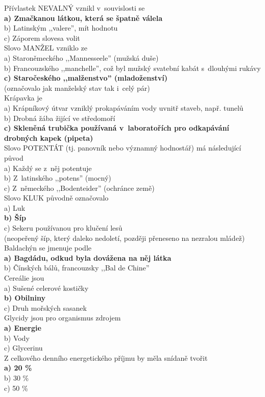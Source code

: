 \begin{multicols}{3}
\noindent
Přívlastek NEVALNÝ vznikl v~souvislosti se\\
\textbf{a) Zmačkanou látkou, která se špatně válela}\\
b) Latinským ,,valere'', mít hodnotu\\
c) Záporem slovesa volit\\

\noindent
Slovo MANŽEL vzniklo ze\\
a) Staroněmeckého ,,Mannesseele'' (mužská duše)\\
b) Francouzského ,,manchelle'', což byl mužský svatební kabát 
s~dlouhými rukávy\\
\textbf{c) Staročeského ,,malženstvo'' (mladoženství)}\\
(označovalo jak manželský stav tak i~celý pár)\\

\noindent
Krápavka je \\
a) Krápníkový útvar vzniklý prokapáváním vody uvnitř staveb, 
např. tunelů\\
b) Drobná žába žijící ve středomoří\\
\textbf{c) Skleněná trubička používaná v~laboratořích pro 
odkapávání drobných kapek (pipeta)}\\

\noindent
Slovo POTENTÁT (tj. panovník nebo významný hodnostář) má následující 
původ\\
a) Každý se z~něj potentuje\\
b) Z~latinského ,,potens'' (mocný)\\
c) Z~německého ,,Bodenteider'' (ochránce země)\\

\noindent
Slovo KLUK původně označovalo\\
a) Luk\\
\textbf{b) Šíp}\\
c) Sekeru používanou pro klučení lesů\\
(neopeřený šíp, který daleko nedoletí, později přeneseno na nezralou 
mládež)\\

\noindent
Baldachýn se jmenuje podle\\
\textbf{a) Bagdádu, odkud byla dovážena na něj látka}\\
b) Čínských bálů, francouzsky ,,Bal de Chine''\\

\noindent
Cereálie jsou\\
a) Sušené celerové kostičky\\
\textbf{b) Obilniny}\\
c) Druh mořských sasanek\\

\noindent
Glycidy jsou pro organismus zdrojem\\
\textbf{a) Energie}\\
b) Vody\\
c) Glycerinu\\

\noindent
Z celkového denního energetického příjmu by měla snídaně tvořit\\
\textbf{a) 20 \%}\\
b) 30 \%\\
c) 50 \%\\

\end{multicols}
\clearpage

